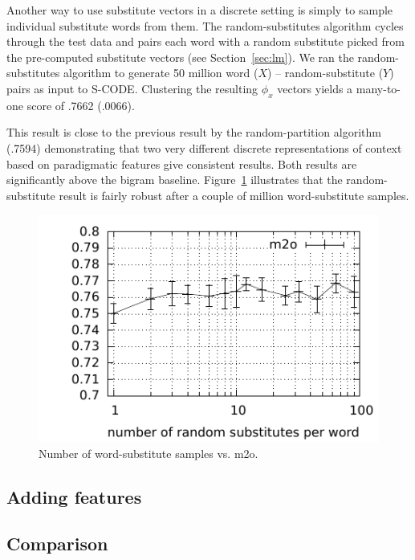 \documentclass[11pt]{article}
\begin{document}
Another way to use substitute vectors in a discrete setting is simply
to sample individual substitute words from them.  The
random-substitutes algorithm cycles through the test data and pairs
each word with a random substitute picked from the pre-computed
substitute vectors (see Section~\ref{sec:lm}).  We ran the
random-substitutes algorithm to generate 50 million word ($X$) --
random-substitute ($Y$) pairs as input to S-CODE.  Clustering the
resulting $\phi_x$ vectors yields a many-to-one score of .7662
(.0066).

This result is close to the previous result by the random-partition
algorithm (.7594) demonstrating that two very different discrete
representations of context based on paradigmatic features give
consistent results.  Both results are significantly above the bigram
baseline.  Figure~\ref{plot-s} illustrates that the random-substitute
result is fairly robust after a couple of million word-substitute
samples.

\begin{figure}[ht] \centering
\includegraphics[width=\linewidth]{plot-s.pdf}
\caption{Number of word-substitute samples vs. m2o.}
\label{plot-s}
\end{figure}

\subsection{Adding features}\label{sec:feat}

\subsection{Comparison}\label{sec:comparison}
\end{document}
